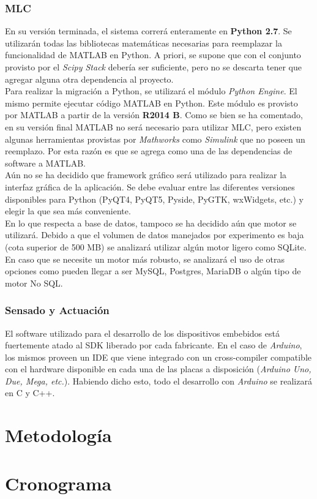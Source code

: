 \documentclass[a4paper,10pt]{article}
\begin{document}
    \subsubsection{MLC}
        En su versión terminada, el sistema correrá enteramente en \textbf{Python 2.7}. Se utilizarán todas las bibliotecas matemáticas 
        necesarias para reemplazar la funcionalidad de MATLAB en Python. A priori, se supone que con el conjunto provisto por el 
        \textit{Scipy Stack} debería ser suficiente, pero no se descarta tener que agregar alguna otra dependencia al proyecto. \\
        \indent Para realizar la migración a Python, se utilizará el módulo \textit{Python Engine}. El mismo permite ejecutar código
        MATLAB en Python. Este módulo es provisto por MATLAB a partir de la versión \textbf{R2014 B}. Como se bien se ha comentado, en su
        versión final MATLAB no será necesario para utilizar MLC, pero existen algunas herramientas provistas por \textit{Mathworks} como
        \textit{Simulink} que no poseen un reemplazo. Por esta razón es que se agrega como una de las dependencias de software a MATLAB. \\
        \indent Aún no se ha decidido que framework gráfico será utilizado para realizar la interfaz gráfica de la aplicación. Se debe
        evaluar entre las diferentes versiones disponibles para Python (PyQT4, PyQT5, Pyside, PyGTK, wxWidgets, etc.) y elegir la que sea
        más conveniente. \\  
        \indent En lo que respecta a base de datos, tampoco se ha decidido aún que motor se utilizará. Debido a que el volumen de datos
        manejados por experimento es baja (cota superior de 500 MB) se analizará utilizar algún motor ligero como SQLite. En caso que se 
        necesite un motor más robusto, se analizará el uso de otras opciones como pueden llegar a ser MySQL, Postgres, MariaDB o algún tipo 
        de motor No SQL. 

    \subsubsection{Sensado y Actuación}
        El software utilizado para el desarrollo de los dispositivos embebidos está fuertemente atado al SDK liberado por cada fabricante.
        En el caso de \textit{Arduino}, los mismos proveen un IDE que viene integrado con un cross-compiler compatible con el hardware
        disponible en cada una de las placas a disposición (\textit{Arduino Uno, Due, Mega, etc.}). Habiendo dicho esto, todo el desarrollo
        con \textit{Arduino} se realizará en C y C++.

    \newpage
    \section{Metodología}
          
    \newpage
    \section{Cronograma}

    \newpage
    {}
    
\end{document}
